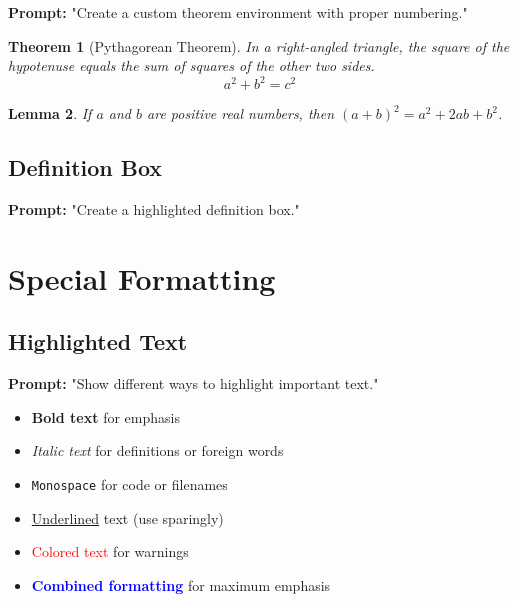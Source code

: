 \documentclass[12pt, a4paper]{article}
\begin{document}
\textbf{Prompt:} "Create a custom theorem environment with proper numbering."

\newtheorem{theorem}{Theorem}[section]
\newtheorem{lemma}[theorem]{Lemma}
\newtheorem{corollary}[theorem]{Corollary}

\begin{theorem}[Pythagorean Theorem]
In a right-angled triangle, the square of the hypotenuse equals the sum of squares of the other two sides.
\begin{equation}
    a^2 + b^2 = c^2
\end{equation}
\end{theorem}

\begin{lemma}
If $a$ and $b$ are positive real numbers, then $(a + b)^2 = a^2 + 2ab + b^2$.
\end{lemma}

\subsection{Definition Box}

\textbf{Prompt:} "Create a highlighted definition box."

\begin{center}
\end{center}

\section{Special Formatting}

\subsection{Highlighted Text}

\textbf{Prompt:} "Show different ways to highlight important text."

\begin{itemize}
    \item \textbf{Bold text} for emphasis
    \item \textit{Italic text} for definitions or foreign words
    \item \texttt{Monospace} for code or filenames
    \item \underline{Underlined} text (use sparingly)
    \item \textcolor{red}{Colored text} for warnings
    \item \textcolor{blue}{\textbf{Combined formatting}} for maximum emphasis
\end{itemize}
\end{document}
